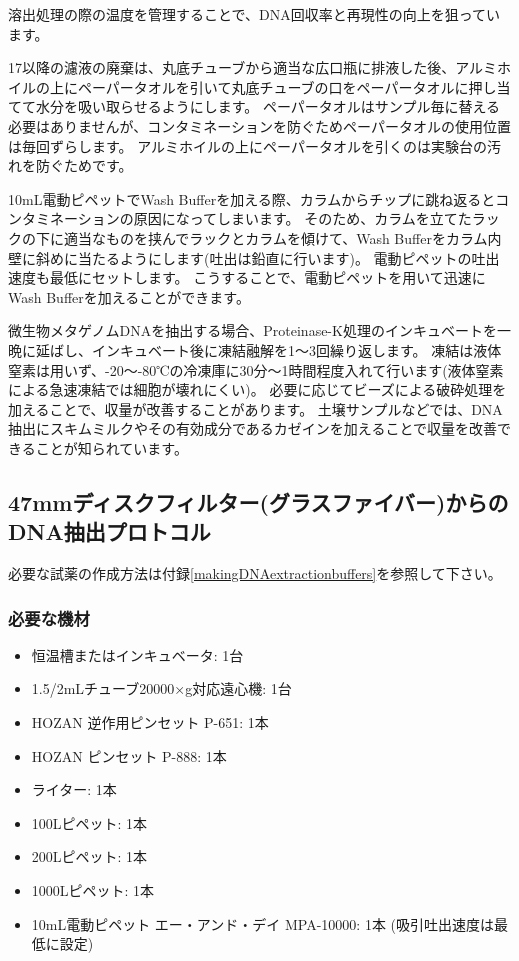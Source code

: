 \documentclass[titlepage,10pt,a4paper,uplatex]{jsbook}
\begin{document}
溶出処理の際の温度を管理することで、DNA回収率と再現性の向上を狙っています。

17以降の濾液の廃棄は、丸底チューブから適当な広口瓶に排液した後、アルミホイルの上にペーパータオルを引いて丸底チューブの口をペーパータオルに押し当てて水分を吸い取らせるようにします。
ペーパータオルはサンプル毎に替える必要はありませんが、コンタミネーションを防ぐためペーパータオルの使用位置は毎回ずらします。
アルミホイルの上にペーパータオルを引くのは実験台の汚れを防ぐためです。

10mL電動ピペットでWash Bufferを加える際、カラムからチップに跳ね返るとコンタミネーションの原因になってしまいます。
そのため、カラムを立てたラックの下に適当なものを挟んでラックとカラムを傾けて、Wash Bufferをカラム内壁に斜めに当たるようにします(吐出は鉛直に行います)。
電動ピペットの吐出速度も最低にセットします。
こうすることで、電動ピペットを用いて迅速にWash Bufferを加えることができます。

微生物メタゲノムDNAを抽出する場合、Proteinase-K処理のインキュベートを一晩に延ばし、インキュベート後に凍結融解を1～3回繰り返します。
凍結は液体窒素は用いず、{-20}～{-80}℃の冷凍庫に30分～1時間程度入れて行います(液体窒素による急速凍結では細胞が壊れにくい)。
必要に応じてビーズによる破砕処理を加えることで、収量が改善することがあります。
土壌サンプルなどでは、DNA抽出にスキムミルクやその有効成分であるカゼインを加えることで収量を改善できることが知られています\citep{Takada-Hoshino2004,Wang2012}。

\subsection{47mmディスクフィルター(グラスファイバー)からのDNA抽出プロトコル}

必要な試薬の作成方法は付録\ref{makingDNAextractionbuffers}を参照して下さい。

\subsubsection{必要な機材}
\begin{itemize}
\item 恒温槽またはインキュベータ: 1台
\item 1.5/2mLチューブ20000×g対応遠心機: 1台
\item HOZAN 逆作用ピンセット P-651: 1本
\item HOZAN ピンセット P-888: 1本
\item ライター: 1本
\item 100{\textmu}Lピペット: 1本
\item 200{\textmu}Lピペット: 1本
\item 1000{\textmu}Lピペット: 1本
\item 10mL電動ピペット エー・アンド・デイ MPA-10000: 1本 (吸引吐出速度は最低に設定)
\end{itemize}
\end{document}
